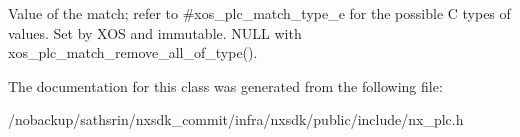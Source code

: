 Value of the match; refer to \#xos\-\_\-plc\-\_\-match\-\_\-type\-\_\-e for the possible C types of values. Set by X\-O\-S and immutable. N\-U\-L\-L with xos\-\_\-plc\-\_\-match\-\_\-remove\-\_\-all\-\_\-of\-\_\-type(). 

The documentation for this class was generated from the following file\-:\begin{DoxyCompactItemize}
\item 
/nobackup/sathsrin/nxsdk\-\_\-commit/infra/nxsdk/public/include/nx\-\_\-plc.\-h\end{DoxyCompactItemize}
